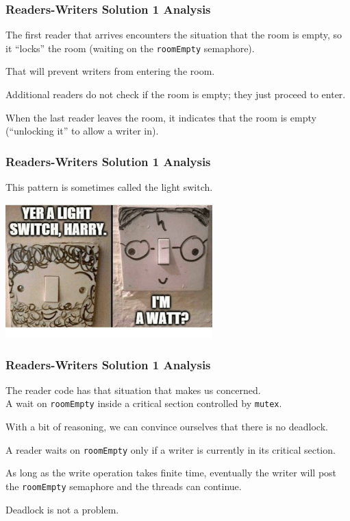\begin{frame}
	\frametitle{Readers-Writers Solution 1 Analysis}

	The first reader that arrives encounters the situation that the room is empty, so it ``locks'' the room (waiting on the \texttt{roomEmpty} semaphore).

	That will prevent writers from entering the room.

	Additional readers do not check if the room is empty; they just proceed to enter.

	When the last reader leaves the room, it indicates that the room is empty (``unlocking it'' to allow a writer in).

\end{frame}

\begin{frame}
	\frametitle{Readers-Writers Solution 1 Analysis}

	This pattern is sometimes called the \alert{light switch}.

	\begin{center}
		\includegraphics[width=0.6\textwidth]{images/lightswitch.png}
	\end{center}

\end{frame}


\begin{frame}
	\frametitle{Readers-Writers Solution 1 Analysis}

	The reader code has that situation that makes us concerned.\\
	\quad A wait on \texttt{roomEmpty} inside a critical section controlled by \texttt{mutex}.

	With a bit of reasoning, we can convince ourselves that there is no deadlock.

	A reader waits on \texttt{roomEmpty} only if a writer is currently in its critical section.

	As long as the write operation takes finite time, eventually the writer will post the \texttt{roomEmpty} semaphore and the threads can continue.

	Deadlock is not a problem.

\end{frame}


